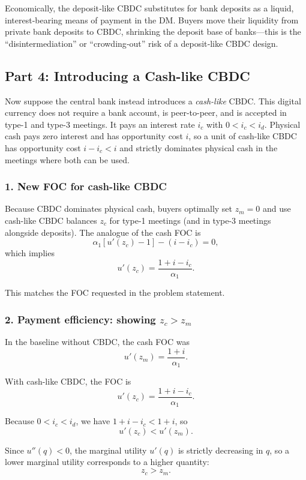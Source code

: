 \documentclass[11pt, a4paper]{article}
\begin{document}
Economically, the deposit‑like CBDC substitutes for bank deposits as a liquid, interest‑bearing means of payment in the DM. Buyers move their liquidity from private bank deposits to CBDC, shrinking the deposit base of banks—this is the “disintermediation” or “crowding‑out” risk of a deposit‑like CBDC design.

\subsection*{Part 4: Introducing a Cash-like CBDC}

Now suppose the central bank instead introduces a \emph{cash-like} CBDC.  
This digital currency does not require a bank account, is peer-to-peer, and is accepted in type-1 and type-3 meetings.  
It pays an interest rate $i_c$ with $0 < i_c < i_d$.  
Physical cash pays zero interest and has opportunity cost $i$, so a unit of cash-like CBDC has opportunity cost $i - i_c < i$ and strictly dominates physical cash in the meetings where both can be used.

\subsubsection*{1. New FOC for cash-like CBDC}

Because CBDC dominates physical cash, buyers optimally set $z_m = 0$ and use cash-like CBDC balances $z_c$ for type-1 meetings (and in type-3 meetings alongside deposits).  
The analogue of the cash FOC is
\[
\alpha_1[u'(z_c) - 1] - (i - i_c) = 0,
\]
which implies
\[
u'(z_c) = \frac{1 + i - i_c}{\alpha_1}.
\]

This matches the FOC requested in the problem statement.

\subsubsection*{2. Payment efficiency: showing $z_c > z_m$}

In the baseline without CBDC, the cash FOC was
\[
u'(z_m) = \frac{1+i}{\alpha_1}.
\]

With cash-like CBDC, the FOC is
\[
u'(z_c) = \frac{1 + i - i_c}{\alpha_1}.
\]

Because $0 < i_c < i_d$, we have $1 + i - i_c < 1 + i$, so
\[
u'(z_c) < u'(z_m).
\]

Since $u''(q)<0$, the marginal utility $u'(q)$ is strictly decreasing in $q$, so a lower marginal utility corresponds to a higher quantity:
\[
z_c > z_m.
\]
\end{document}
